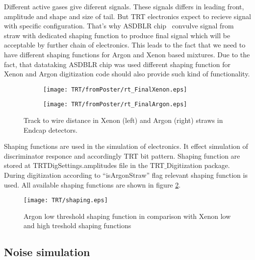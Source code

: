 Different active gases give diferent signals. These signals differs in leading front, amplitude and shape and size of tail. But TRT electronics expect to recieve signal with specific configuration.
That's why ASDBLR chip~\cite{TRT_electronics} convulve signal from straw with dedicated shaping function to produce final signal which will be acceptable by further chain of electronics. This leads to the fact that we need
to have different shaping functions for Argon and Xenon based mixtures.
Due to the fact, that datataking ASDBLR chip was used different shaping function for Xenon and Argon 
digitization code should also provide such kind of functionality. 

\begin{figure}

\begin{subfigure}{.5\textwidth}
  \centering
  \texttt{[image: TRT/fromPoster/rt\_FinalXenon.eps]}
\end{subfigure}%
\begin{subfigure}{.5\textwidth}
  \centering
  \texttt{[image: TRT/fromPoster/rt\_FinalArgon.eps]}
\end{subfigure}

\caption{Track to wire distance in Xenon (left) and Argon (right) straws in Endcap detectors.}
  \label{fig:RT_xenon_argon}
\end{figure}

Shaping functions are used in the simulation of electronics. It effect simulation of discriminator responce and accordingly TRT bit pattern.
Shaping function are stored at \mbox{TRTDigSettings.amplitudes} file in the \mbox{TRT$\_$Digitization} package. During digitization according to ``isArgonStraw'' flag relevant shaping function is used. 
All available shaping functions are shown in figure \ref{fig:shaping}.

\begin{figure}
\begin{center}
 \texttt{[image: TRT/shaping.eps]}
\caption{\label{fig:shaping} Argon low threshold shaping function in comparison with Xenon low and high treshold shaping functions}
\end{center}
\end{figure}





\subsection{Noise simulation}

